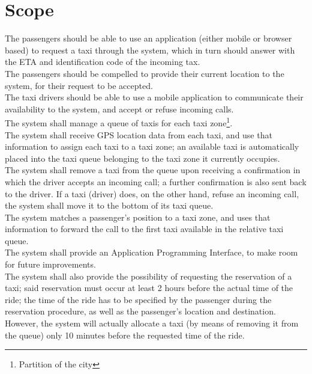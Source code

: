 \documentclass[a4paper,11pt]{report}
\begin{document}
\section{Scope}
The passengers should be able to use an application (either mobile or browser based) to request a taxi through the system,
which in turn should answer with the ETA and identification code of the incoming tax. \\
The passengers should be compelled to provide their current location to the system, for their request to be accepted. \\
The taxi drivers should be able to use a mobile application to communicate their availability to the system, and accept
 or refuse incoming calls. \\
The system shall manage a queue of taxis for each taxi zone\footnote{Partition of the city}. \\
The system shall receive GPS location data from each taxi, and use that information to assign each taxi to a 
taxi zone; an available taxi is automatically placed into the taxi queue belonging to the taxi zone it currently occupies. \\
The system shall remove a taxi from the queue upon receiving a confirmation in which the driver accepts an incoming call; a
further confirmation is also sent back to the driver. If a taxi (driver) does, on the other hand, refuse an incoming call, the system
shall move it to the bottom of its taxi queue. \\
The system matches a passenger's position to a taxi zone, and uses that information to forward the call to the first taxi
available in the relative taxi queue. \\
The system shall provide an Application Programming Interface, to make room for future improvements. \\
The system shall also provide the possibility of requesting the reservation of a taxi; said reservation must occur at least
2 hours before the actual time of the ride; the time of the ride has to be specified by the passenger during the
reservation procedure, as well as the passenger's location and destination. \\
However, the system will actually allocate a taxi (by means of removing it from the queue) only 10 minutes before the
requested time of the ride.
\end{document}
